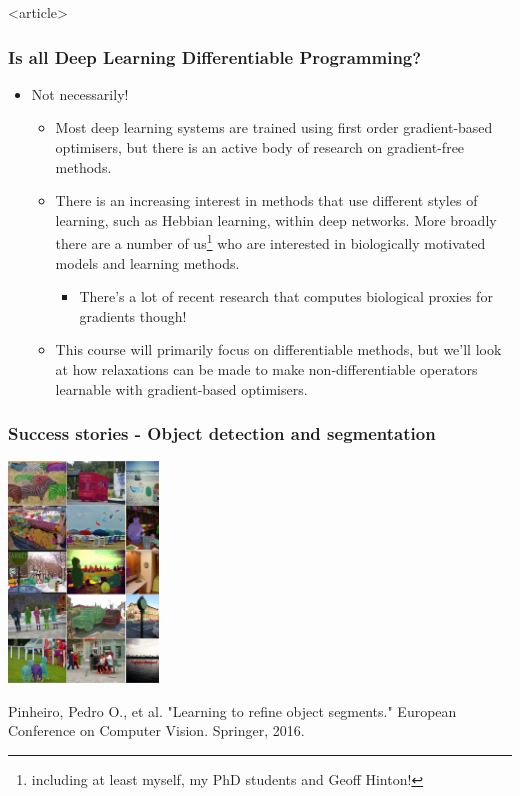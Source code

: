 \documentclass[]{article}
\begin{document}
\begin{frame}<article>
\frametitle{Is all Deep Learning Differentiable Programming?}
\begin{itemize}
	\item Not necessarily!
	\begin{itemize}
		\item<+-> Most deep learning systems are trained using first order gradient-based optimisers, but there is an active body of research on gradient-free methods.
		\item<+-> There is an increasing interest in methods that use different styles of learning, such as Hebbian learning, within deep networks. More broadly there are a number of us\footnote{including at least myself, my PhD students and Geoff Hinton!} who are interested in biologically motivated models and learning methods.
		\begin{itemize}
			\item<+-> There's a lot of recent research that computes biological proxies for gradients though!
		\end{itemize}

		\item<+-> This course will primarily focus on differentiable methods, but we'll look at how relaxations can be made to make non-differentiable operators learnable with gradient-based optimisers.
	\end{itemize}
\end{itemize}
\end{frame}

\begin{frame}
	\frametitle{Success stories - Object detection and segmentation}
	\centering \includegraphics[width=0.3\textwidth]{objseg.pdf}
	\par\footnotesize{Pinheiro, Pedro O., et al. "Learning to refine object segments." European Conference on Computer Vision. Springer, 2016.}
\end{frame}
\end{document}
